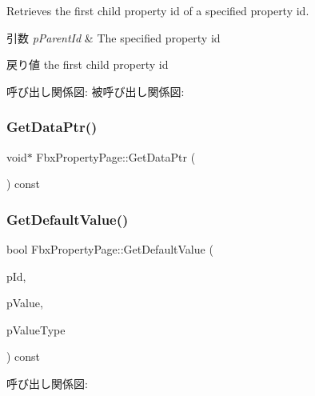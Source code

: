 Retrieves the first child property id of a specified property id. 
\begin{DoxyParams}{引数}
{\em p\+Parent\+Id} & The specified property id \\
\hline
\end{DoxyParams}
\begin{DoxyReturn}{戻り値}
the first child property id 
\end{DoxyReturn}
呼び出し関係図\+:
被呼び出し関係図\+:
\mbox{\label{class_fbx_property_page_a6ad972f243413eb30ad74a0c0965db36}} 
\subsubsection{\texorpdfstring{Get\+Data\+Ptr()}{GetDataPtr()}}
{\footnotesize\ttfamily void$\ast$ Fbx\+Property\+Page\+::\+Get\+Data\+Ptr (\begin{DoxyParamCaption}{ }\end{DoxyParamCaption}) const}

\mbox{\label{class_fbx_property_page_a808492bc7526ffc1ad1abb7364cbd918}} 
\subsubsection{\texorpdfstring{Get\+Default\+Value()}{GetDefaultValue()}}
{\footnotesize\ttfamily bool Fbx\+Property\+Page\+::\+Get\+Default\+Value (\begin{DoxyParamCaption}\item[{\hyperlink{fbxtypes_8h_a088fa96de3b0b3ea69f0f6afef525dfb}{Fbx\+Int}}]{p\+Id,  }\item[{void $\ast$}]{p\+Value,  }\item[{\hyperlink{fbxpropertytypes_8h_a73913a5ddfb20e57c6f25e9e6784bd92}{E\+Fbx\+Type}}]{p\+Value\+Type }\end{DoxyParamCaption}) const}

呼び出し関係図\+:
\mbox{\label{class_fbx_property_page_af13a1f816102911f882837c77caa4d38}} 
